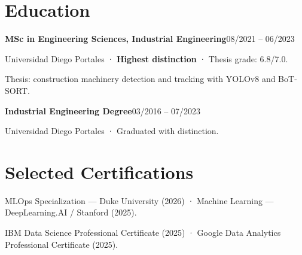 \documentclass[10pt,a4paper]{article}
\newcommand{\entry}[2]{\par\addvspace{3pt}\textbf{#1}\hfill{\fontsize{9.5}{11}\selectfont\color{muted}#2}\par\nopagebreak}
\begin{document}
\section{Education}
\entry{MSc in Engineering Sciences, Industrial Engineering}{08/2021 -- 06/2023}
Universidad Diego Portales · \textbf{Highest distinction} · Thesis grade: 6.8/7.0.\par
Thesis: construction machinery detection and tracking with YOLOv8 and BoT-SORT.\par
\entry{Industrial Engineering Degree}{03/2016 -- 07/2023}
Universidad Diego Portales · Graduated with distinction.

\section{Selected Certifications}
MLOps Specialization — Duke University (2026) · Machine Learning — DeepLearning.AI / Stanford (2025).\par
IBM Data Science Professional Certificate (2025) · Google Data Analytics Professional Certificate (2025).
\end{document}
